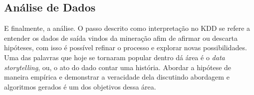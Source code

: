 \subsection{Análise de Dados}
E finalmente, a análise. O passo descrito como interpretação no KDD se refere a entender os dados de saída vindos da mineração afim de afirmar ou descarta hipóteses, com isso é possível refinar o processo e explorar novas possibilidades. Uma das palavras que hoje se tornaram popular dentro dá área é o \textit{data storytelling}, ou, o ato do dado contar uma história. Abordar a hipótese de maneira empírica e demonstrar a veracidade dela discutindo abordagem e algoritmos gerados é um dos objetivos dessa área.

